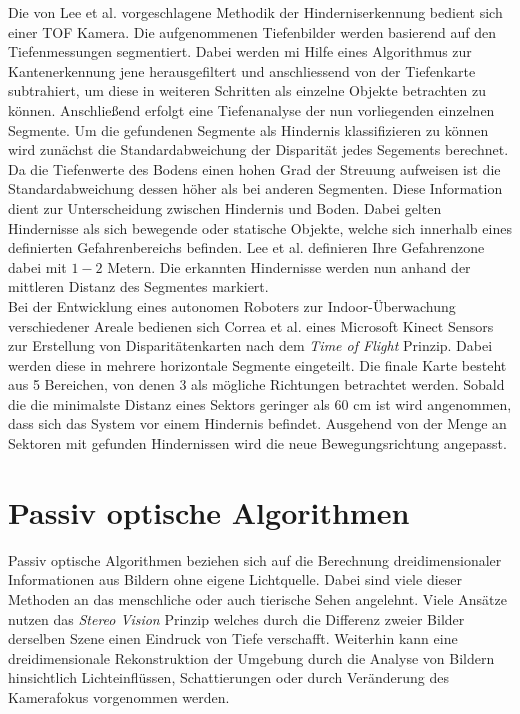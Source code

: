 \noindent
Die von Lee et al. \cite{lee2012intelligent} vorgeschlagene Methodik der Hinderniserkennung bedient sich einer TOF Kamera. Die aufgenommenen Tiefenbilder werden basierend auf den Tiefenmessungen segmentiert. Dabei werden mi Hilfe eines Algorithmus zur Kantenerkennung jene herausgefiltert und anschliessend von der Tiefenkarte subtrahiert, um diese in weiteren Schritten als einzelne Objekte betrachten zu können. Anschließend erfolgt eine Tiefenanalyse der nun vorliegenden einzelnen Segmente. Um die gefundenen Segmente als Hindernis klassifizieren zu können wird zunächst die Standardabweichung der Disparität jedes Segements berechnet. Da die Tiefenwerte des Bodens einen hohen Grad der Streuung aufweisen ist die Standardabweichung dessen höher als bei anderen Segmenten. Diese Information dient zur Unterscheidung zwischen Hindernis und Boden. Dabei gelten Hindernisse als sich bewegende oder statische Objekte, welche sich innerhalb eines definierten Gefahrenbereichs befinden. Lee et al. definieren Ihre Gefahrenzone dabei mit $1-2$ Metern. Die erkannten Hindernisse werden nun anhand der mittleren Distanz des Segmentes markiert.\\

\noindent
Bei der Entwicklung eines autonomen Roboters zur Indoor-Überwachung verschiedener Areale bedienen sich Correa et al. \cite{correa2012mobile} eines Microsoft Kinect Sensors zur Erstellung von Disparitätenkarten nach dem \emph{Time of Flight} Prinzip. Dabei werden diese in mehrere horizontale Segmente eingeteilt. Die finale Karte besteht aus 5 Bereichen, von denen 3 als mögliche Richtungen betrachtet werden. Sobald die die minimalste Distanz eines Sektors geringer als 60 cm ist wird angenommen, dass sich das System vor einem Hindernis befindet. Ausgehend von der Menge an Sektoren mit gefunden Hindernissen wird die neue Bewegungsrichtung angepasst.

\section{Passiv optische Algorithmen}
\label{sec:sensor_basierte_he}
Passiv optische Algorithmen beziehen sich auf die Berechnung dreidimensionaler Informationen aus Bildern ohne eigene Lichtquelle. Dabei sind viele dieser Methoden an das menschliche oder auch tierische Sehen angelehnt. Viele Ansätze nutzen das \emph{Stereo Vision} Prinzip  welches durch die Differenz zweier Bilder derselben Szene einen Eindruck von Tiefe verschafft. Weiterhin kann eine dreidimensionale Rekonstruktion der Umgebung durch die Analyse von Bildern hinsichtlich Lichteinflüssen, Schattierungen oder durch Veränderung des Kamerafokus vorgenommen werden.\\

